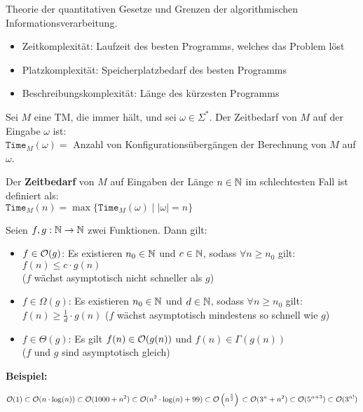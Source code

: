 
Theorie der quantitativen Gesetze und Grenzen der algorithmischen Informationsverarbeitung.
\begin{itemize}
    \item Zeitkomplexität: Laufzeit des besten Programms, welches das Problem löst
    \item Platzkomplexität: Speicherplatzbedarf des besten Programms
    \item Beschreibungskomplexität: Länge des kürzesten Programms
\end{itemize}

Sei $M$ eine TM, die immer hält, und sei $\omega \in \Sigma^*$.
Der Zeitbedarf von $M$ auf der Eingabe $\omega$ ist:\\
$\texttt{Time}_M(\omega) =$ Anzahl von Konfigurationsübergängen der Berechnung von $M$ auf $\omega$.

Der \textbf{Zeitbedarf} von $M$ auf Eingaben der Länge $n \in \mathbb{N}$ im schlechtesten Fall ist definiert als:\\
$\texttt{Time}_M(n) = \max\{\texttt{Time}_M(\omega) \mid |\omega| = n\}$


Seien $f,g: \mathbb{N} \rightarrow \mathbb{N}$ zwei Funktionen.
Dann gilt:
\begin{itemize}
    \item $f \in \mathcal{O}(g)$: Es existieren $n_0 \in \mathbb{N}$ und $c \in \mathbb{N}$, sodass $\forall n \geq n_0$ gilt:\\
    $f(n) \leq c \cdot g(n)$\\
    ($f$ wächst asymptotisch nicht schneller als $g$)
    \item $f \in \Omega(g)$: Es existieren $n_0 \in \mathbb{N}$ und $d \in \mathbb{N}$, sodass $\forall n \geq n_0$ gilt:\\
    $f(n) \geq \frac{1}{d} \cdot g(n)$
    ($f$ wächst asymptotisch mindestens so schnell wie $g$)
    \item $f \in \Theta(g)$: Es gilt $f(n) \in \mathcal{O}(g(n))$ und $f(n) \in \Gamma(g(n))$\\
    ($f$ und $g$ sind asymptotisch gleich)
\end{itemize}

\textbf{Beispiel:}

$\displaystyle \mathcal{O}(1) \subset \mathcal{O}(n \cdot \log(n)) \subset \mathcal{O}(1000 + n^2) \\
\subset \mathcal{O}(n^2 \cdot \log(n) + 99) \subset \mathcal{O}\left(n^{\frac{5}{2}}\right) \\
\subset \mathcal{O}(3^n + n^2) \subset \mathcal{O}(5^{n + 3}) \subset \mathcal{O}(3^{n!})$

